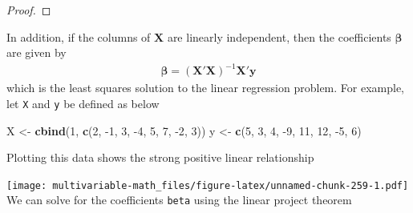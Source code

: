 \documentclass[
]{book}
\newenvironment{Shaded}{\begin{snugshade}}{\end{snugshade}}
\newcommand{\CommentTok}[1]{\textcolor[rgb]{0.56,0.35,0.01}{\textit{#1}}}
\newcommand{\DataTypeTok}[1]{\textcolor[rgb]{0.13,0.29,0.53}{#1}}
\newcommand{\DecValTok}[1]{\textcolor[rgb]{0.00,0.00,0.81}{#1}}
\newcommand{\KeywordTok}[1]{\textcolor[rgb]{0.13,0.29,0.53}{\textbf{#1}}}
\newcommand{\NormalTok}[1]{#1}
\newcommand{\OperatorTok}[1]{\textcolor[rgb]{0.81,0.36,0.00}{\textbf{#1}}}
\newcommand{\StringTok}[1]{\textcolor[rgb]{0.31,0.60,0.02}{#1}}
\theoremstyle{definition}
\theoremstyle{definition}
\theoremstyle{definition}
\theoremstyle{remark}
\begin{document}
\begin{proof}
{}
\end{proof}

In addition, if the columns of \(\mathbf{X}\) are linearly independent, then the coefficients \(\boldsymbol{\beta}\) are given by
\[
\begin{aligned}
\boldsymbol{\beta} = \left( \mathbf{X}'\mathbf{X} \right)^{-1} \mathbf{X}' \mathbf{y}
\end{aligned}
\]
which is the least squares solution to the linear regression problem. For example, let \texttt{X} and \texttt{y} be defined as below

\begin{Shaded}
\begin{Highlighting}[]
\NormalTok{X <-}\StringTok{ }\KeywordTok{cbind}\NormalTok{(}\DecValTok{1}\NormalTok{, }\KeywordTok{c}\NormalTok{(}\DecValTok{2}\NormalTok{, }\DecValTok{-1}\NormalTok{, }\DecValTok{3}\NormalTok{, }\DecValTok{-4}\NormalTok{, }\DecValTok{5}\NormalTok{, }\DecValTok{7}\NormalTok{, }\DecValTok{-2}\NormalTok{, }\DecValTok{3}\NormalTok{))}
\NormalTok{y <-}\StringTok{ }\KeywordTok{c}\NormalTok{(}\DecValTok{5}\NormalTok{, }\DecValTok{3}\NormalTok{, }\DecValTok{4}\NormalTok{, }\DecValTok{-9}\NormalTok{, }\DecValTok{11}\NormalTok{, }\DecValTok{12}\NormalTok{, }\DecValTok{-5}\NormalTok{, }\DecValTok{6}\NormalTok{)}
\end{Highlighting}
\end{Shaded}

Plotting this data shows the strong positive linear relationship

\begin{Shaded}
\end{Shaded}

\texttt{[image: multivariable-math\_files/figure-latex/unnamed-chunk-259-1.pdf]}
We can solve for the coefficients \texttt{beta} using the linear project theorem

\begin{Shaded}
\end{Shaded}
\end{document}
